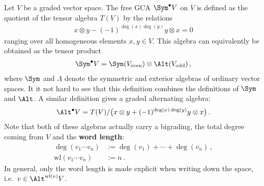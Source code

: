     \begin{example}\label{hda:symmetric_algebra}
        Let $V$ be a graded vector space. The free GCA $\Sym^\bullet V$ on $V$ is defined as the quotient of the tensor algebra $T(V)$ by the relations
        \begin{gather}
            x\otimes y-(-1)^{\deg(x)\deg(y)}y\otimes x=0
        \end{gather}
        ranging over all homogeneous elements $x,y\in V$. This algebra can equivalently be obtained as the tensor product
        \begin{gather}
            \Sym^\bullet V = \Sym(V_{\text{even}})\otimes\Alt(V_{\text{odd}})\,,
        \end{gather}
        where $\Sym$ and $\Lambda$ denote the symmetric and exterior algebras of ordinary vector spaces. It it not hard to see that this definition combines the definitions of $\Sym$ and $\Alt$. A similar definition gives a graded alternating algebra:
        \begin{gather}
            \Alt^\bullet V = T(V)/\bigl(x\otimes y+(-1)^{\deg(x)\deg(y)}y\otimes x\bigr)\,.
        \end{gather}
        Note that both of these algebras actually carry a bigrading, the total degree coming from $V$ and the \textbf{word length}:
        \begin{align}
            \deg(v_1\cdots v_n) &:= \deg(v_1)+\cdots+\deg(v_n)\,,\\
            \mathrm{wl}(v_1\cdots v_n) &:= n\,.
        \end{align}
        In general, only the word length is made explicit when writing down the space, i.e.~$v\in\Alt^{\mathrm{wl}(v)}V$.
    \end{example}
